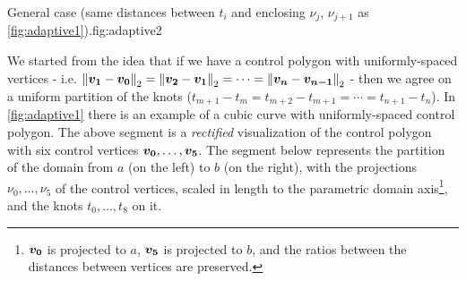 \documentclass[dissertation.tex]{subfiles}
\begin{document}
\begin{myfig}{General case (same distances between
    $t_i$ and enclosing $\nu_j$, $\nu_{j+1}$ as \cref{fig:adaptive1}).}{fig:adaptive2}
\end{myfig}
We started from the idea that if we have a control polygon with
uniformly-spaced vertices -
i.e. $\left\lVert\boldsymbol{v_1}-\boldsymbol{v_0}\right\rVert_2=\left\lVert\boldsymbol{v_2}-\boldsymbol{v_1}\right\rVert_2=\cdots=\left\lVert\boldsymbol{v_n}-\boldsymbol{v_{n-1}}\right\rVert_2$
- then we agree on a uniform partition of the knots
($t_{m+1}-t_m=t_{m+2}-t_{m+1}=\cdots=t_{n+1}-t_n$). In
\cref{fig:adaptive1} there is an example of a cubic \bs curve with
uniformly-spaced control polygon. The above segment is a
\emph{rectified} 
visualization of the control polygon with six control
vertices
$\boldsymbol{v_0},\dots,\boldsymbol{v_5}$. The segment below represents the
partition of the domain from $a$ (on the left) to $b$
(on the right), with the projections $\nu_0,\dots,\nu_5$ of the control
vertices,
scaled in length to the parametric domain axis\footnote{$\boldsymbol{v_0}$ is
  projected to $a$, $\boldsymbol{v_5}$ is projected to $b$, and the ratios
  between the distances between vertices are preserved.}, and the
knots $t_0,\dots,t_8$ on it.
\end{document}

